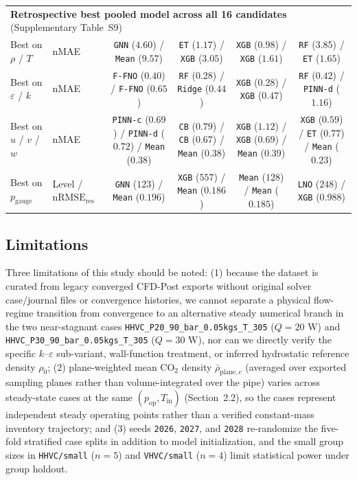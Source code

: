 \documentclass[11pt]{article}
\begin{document}
\begin{table}[!htbp]
{\begin{tabular}{llcccc}
\midrule
\multicolumn{6}{l}{\textbf{Retrospective best pooled model across all 16 candidates} (Supplementary Table~S9)} \\
Best on $\rho$ / $T$ & nMAE & \texttt{GNN} ($4.60$) / \texttt{Mean} ($9.57$) & \texttt{ET} ($1.17$) / \texttt{XGB} ($3.05$) & \texttt{XGB} ($0.98$) / \texttt{XGB} ($1.61$) & \texttt{RF} ($3.85$) / \texttt{ET} ($1.65$) \\
Best on $\varepsilon$ / $k$ & nMAE & \texttt{F-FNO} ($0.40$) / \texttt{F-FNO} ($0.65$) & \texttt{RF} ($0.28$) / \texttt{Ridge} ($0.44$) & \texttt{XGB} ($0.28$) / \texttt{XGB} ($0.47$) & \texttt{RF} ($0.42$) / \texttt{PINN-d} ($1.16$) \\
Best on $u$ / $v$ / $w$ & nMAE & \texttt{PINN-c} ($0.69$) / \texttt{PINN-d} ($0.72$) / \texttt{Mean} ($0.38$) & \texttt{CB} ($0.79$) / \texttt{CB} ($0.67$) / \texttt{Mean} ($0.38$) & \texttt{XGB} ($1.12$) / \texttt{XGB} ($0.69$) / \texttt{Mean} ($0.39$) & \texttt{XGB} ($0.59$) / \texttt{ET} ($0.77$) / \texttt{Mean} ($0.23$) \\
Best on $p_{\mathrm{gauge}}$ & Level / $\mathrm{nRMSE}_{\mathrm{res}}$ & \texttt{GNN} ($123$) / \texttt{Mean} ($0.196$) & \texttt{XGB} ($557$) / \texttt{Mean} ($0.186$) & \texttt{Mean} ($128$) / \texttt{Mean} ($0.185$) & \texttt{LNO} ($248$) / \texttt{XGB} ($0.988$) \\
\bottomrule
\end{tabular}%
}
\end{table}

\subsection{Limitations}
Three limitations of this study should be noted: (1) because the dataset is curated from legacy converged CFD-Post exports without original solver case/journal files or convergence histories, we cannot separate a physical flow-regime transition from convergence to an alternative steady numerical branch in the two near-stagnant cases \texttt{HHVC\_P20\_90\_bar\_0.05kgs\_T\_305} ($Q=20\text{ W}$) and \texttt{HHVC\_P30\_90\_bar\_0.05kgs\_T\_305} ($Q=30\text{ W}$), nor can we directly verify the specific $k$--$\varepsilon$ sub-variant, wall-function treatment, or inferred hydrostatic reference density $\rho_0$; (2) plane-weighted mean $\mathrm{CO}_2$ density $\bar{\rho}_{\mathrm{plane},c}$ (averaged over exported sampling planes rather than volume-integrated over the pipe) varies across steady-state cases at the same $(p_{\mathrm{op}}, T_{\mathrm{in}})$ (Section~2.2), so the cases represent independent steady operating points rather than a verified constant-mass inventory trajectory; and (3) seeds \texttt{2026}, \texttt{2027}, and \texttt{2028} re-randomize the five-fold stratified case splits in addition to model initialization, and the small group sizes in \texttt{HHVC/small} ($n=5$) and \texttt{VHVC/small} ($n=4$) limit statistical power under group holdout.
\end{document}
